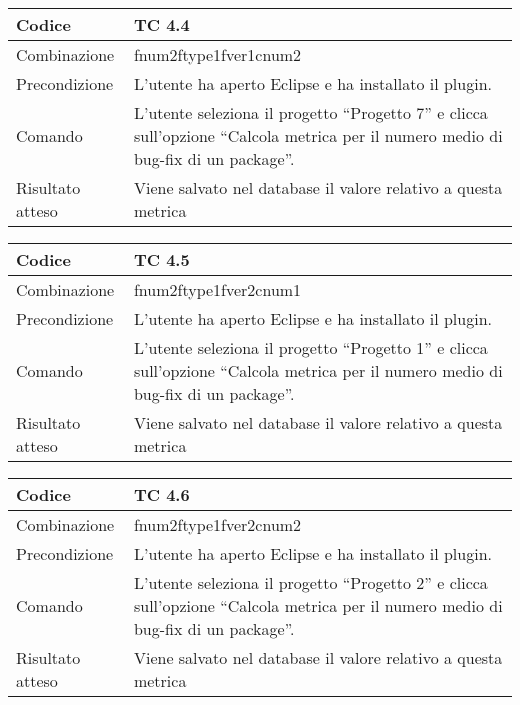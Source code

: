 \begin{table}[ht]
\begin{tabular}{|p{3cm}|p{9cm}|}
\hline
\cellcolor{lightgray}Codice				& TC 4.4								\\
\hline
\cellcolor{lightgray}Combinazione		& fnum2ftype1fver1cnum2								\\
\hline
\cellcolor{lightgray}Precondizione		& L'utente ha aperto Eclipse e ha installato il plugin.			\\
\hline
\cellcolor{lightgray}Comando			& L'utente seleziona il progetto ``Progetto 7''  e clicca sull'opzione ``Calcola metrica per il numero medio di bug-fix di un package''.	\\
\hline
\cellcolor{lightgray}Risultato atteso	& Viene salvato nel database il valore relativo a questa metrica	\\
\hline
\end{tabular}
\end{table}

\begin{table}[ht]
\begin{tabular}{|p{3cm}|p{9cm}|}
\hline
\cellcolor{lightgray}Codice				& TC 4.5								\\
\hline
\cellcolor{lightgray}Combinazione		& fnum2ftype1fver2cnum1 									\\
\hline
\cellcolor{lightgray}Precondizione		& L'utente ha aperto Eclipse e ha installato il plugin.			\\
\hline
\cellcolor{lightgray}Comando			& L'utente seleziona il progetto ``Progetto 1''  e clicca sull'opzione ``Calcola metrica per il numero medio di bug-fix di un package''.	\\
\hline
\cellcolor{lightgray}Risultato atteso	& Viene salvato nel database il valore relativo a questa metrica	\\
\hline
\end{tabular}
\end{table}

\begin{table}[ht]
\begin{tabular}{|p{3cm}|p{9cm}|}
\hline
\cellcolor{lightgray}Codice				& TC 4.6								\\
\hline
\cellcolor{lightgray}Combinazione		& fnum2ftype1fver2cnum2								\\
\hline
\cellcolor{lightgray}Precondizione		& L'utente ha aperto Eclipse e ha installato il plugin.				\\
\hline
\cellcolor{lightgray}Comando			& L'utente seleziona il progetto ``Progetto 2''  e clicca sull'opzione ``Calcola metrica per il numero medio di bug-fix di un package''.	\\
\hline
\cellcolor{lightgray}Risultato atteso	& Viene salvato nel database il valore relativo a questa metrica	\\
\hline
\end{tabular}
\end{table}

